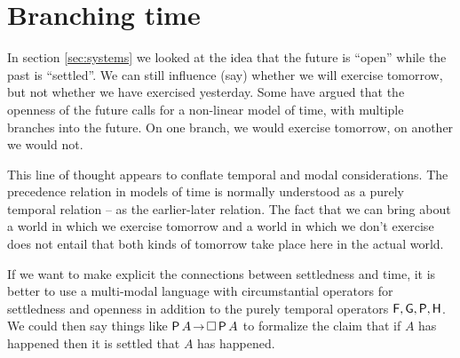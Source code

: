


\section{Branching time}\label{sec:branching}

In section \ref{sec:systems} we looked at the idea that the future is ``open''
while the past is ``settled''. We can still influence (say) whether we will
exercise tomorrow, but not whether we have exercised yesterday. Some have argued
that the openness of the future calls for a non-linear model of time, with
multiple branches into the future. On one branch, we would exercise tomorrow, on
another we would not.

This line of thought appears to conflate temporal and modal considerations.
The precedence relation in models of time is normally understood as a purely
temporal relation -- as the earlier-later relation. The fact that we can bring
about a world in which we exercise tomorrow and a world in which we don't
exercise does not entail that both kinds of tomorrow take place here in the
actual world.

If we want to make explicit the connections between settledness and time, it is
better to use a multi-modal language with circumstantial operators for
settledness and openness in addition to the purely temporal operators
$\operatorname{\mathsf{F}}, \operatorname{\mathsf{G}}, \operatorname{\mathsf{P}}, \operatorname{\mathsf{H}}$. We could then say things like $\tP A \to \Box \tP A$ to
formalize the claim that if $A$ has happened then it is settled that $A$ has
happened.



